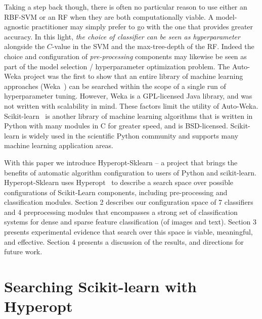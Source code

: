 \documentclass[wcp]{jmlr}
\begin{document}
Taking a step back though, there is often no particular reason to use either an RBF-SVM or an RF when they are both computationally viable.
A model-agnostic practitioner may simply prefer to go with the one that provides greater accuracy.
In this light, {\em the choice of classifier can be seen as hyperparameter} alongside the $C$-value in the SVM and the max-tree-depth of the RF.
Indeed the choice and configuration of {\em pre-processing} components may likewise be seen as part of the model selection / hyperparameter optimization problem.
The Auto-Weka project \citep{thornton+hutter+hoos+leyton-brown:2012} was the first to show that an entire library of machine learning approaches (Weka~\citep{hall2009weka}) can be searched within the scope of a single run of hyperparameter tuning.
However, Weka is a GPL-licensed Java library, and was not written with scalability in mind. These factors limit the utility of Auto-Weka.
Scikit-learn~\citep{sklearn} is another library of machine learning algorithms that is written in Python with many modules in C for greater speed, and is BSD-licensed.
Scikit-learn is widely used in the scientific Python community and supports many machine learning application areas.

With this paper we introduce Hyperopt-Sklearn -- a project that brings the benefits of automatic algorithm configuration to users of Python and scikit-learn.
Hyperopt-Sklearn uses Hyperopt~\citep{hyperopt} to describe a search space over possible configurations of Scikit-Learn components, including pre-processing and classification modules.
Section 2 describes our configuration space of 7 classifiers and 4 preprocessing modules that encompasses a strong set of classification systems for dense and sparse feature classification (of images and text).
Section 3 presents experimental evidence that search over this space is viable, meaningful, and effective.
Section 4 presents a discussion of the results, and directions for future work.


\section{Searching Scikit-learn with Hyperopt}
\end{document}
